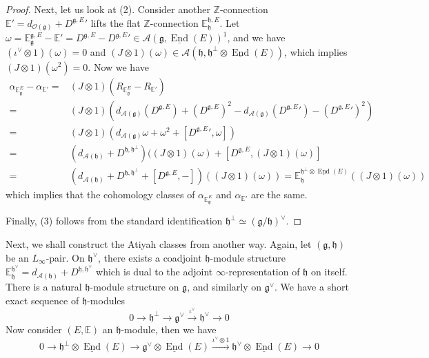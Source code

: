 \documentclass[12pt]{amsart}
\theoremstyle{definition}
\theoremstyle{remark}
\numberwithin{equation}{section}
\newcommand{\CA}{{\mathcal A}}
\newcommand{\CO}{{\mathcal O}}
\newcommand{\Z}{{\mathbb{Z}}}
\newcommand{\1}{{\mathbb{1}}}
\newcommand{\g}{\mathfrak{g}}
\newcommand{\h}{\mathfrak{h}}
\newcommand{\End}{\operatorname{End}}
\begin{document}
\begin{proof}
Next, let us look at (2). Consider another $\Z$-connection $\mathbb{E}' = d_{\CO(\g)} + {D^{\g, E}}'$ lifts the flat $\Z$-connection $\mathbb{E}^{\h, E}_{\h}$. Let $\omega = \mathbb{E}^{\g, E}_{\g} - \mathbb{E}' = D^{\g, E} - {D^{\g, E}}' \in \CA(\g, \underline{\End}(E))^1$, and we have $(\iota^{\vee} \otimes 1)(\omega) = 0$ and $(J\otimes 1)(\omega) \in \CA(\h, \h^{\perp} \otimes \underline{\End}(E))$, which implies $(J\otimes 1)(\omega^2) = 0$.  Now we have
\begin{align*}
    \alpha_{\mathbb{E}_{\g}^E} - \alpha_{\mathbb{E}'} =& (J\otimes 1)(R_{\mathbb{E}_{\g}^E} - R_{\mathbb{E}'})\\
    =& (J\otimes 1)(d_{\CA(\g)}(D^{\g, E}) + (D^{\g, E})^2 - d_{\CA(\g)}({D^{\g, E}}') - ({D^{\g, E}}')^2)\\
    =& (J\otimes 1)( d_{\CA(\g)} \omega  + \omega^2 +[{D^{\g, E}}', \omega])\\
    =& (d_{\CA(\h)} + D^{\h, \h^{\perp}})((J\otimes 1)(\omega) + [D^{\g, E}, (J\otimes 1)(\omega)]\\
    =& (d_{\CA(\h)} + D^{\h, \h^{\perp}} + [D^{\g, E}, -])((J\otimes 1)(\omega)) = \mathbb{E}_{\h}^{\h^{\perp}\otimes \underline{\End}(E)}((J\otimes 1)(\omega))
\end{align*}
which implies that the cohomology classes of $\alpha_{\mathbb{E}_{\g}^E} $ and $ \alpha_{\mathbb{E}'}$ are the same.

Finally, (3) follows from the standard identification $\h^{\perp} \simeq (\g / \h)^{\vee}$.



\end{proof}
Next, we shall construct the Atiyah classes from another way. Again, let $(\g, \h)$ be an $L_{\infty}$-pair. On $\h^{\vee}$, there exists a coadjoint $\h$-module structure $\mathbb{E}_{\h}^{\h^{\vee}} = d_{\CA(\h)} + D^{\h, \h^{\vee}}$ which is dual to the adjoint $\infty$-representation of $\h$ on itself. There is a natural $\h$-module structure on $\g$, and similarly on $\g^{\vee}$. We have a short exact sequence of $\h$-modules
\begin{equation*}
    0 \to \h^{\perp} \to \g^{\vee} \stackrel{\iota^{\vee}}{\to} \h^{\vee}\to 0
\end{equation*}
Now consider $(E, \mathbb{E})$ an $\h$-module, then we have 
\begin{equation*}
    0 \to \h^{\perp}\otimes \underline{\End}(E) \to \g^{\vee}\otimes \underline{\End}(E) \stackrel{\iota^{\vee}\otimes 1}{\to} \h^{\vee}\otimes \underline{\End}(E)\to 0
\end{equation*}
\end{document}
